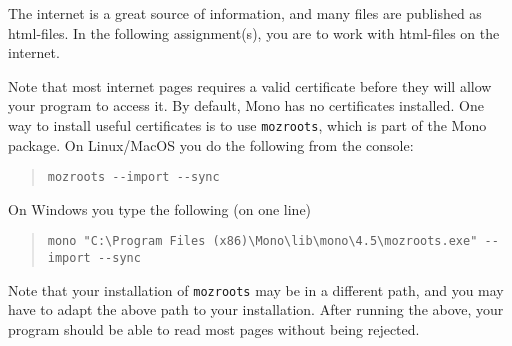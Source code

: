 The internet is a great source of information, and many files are
published as html-files. In the following assignment(s), you are to
work with html-files on the internet.

Note that most internet pages requires a valid certificate before they will allow your program to access it. By default, Mono has no certificates installed. One way to install useful certificates is to use \lstinline[language=console]{mozroots}, which is part of the Mono package. On Linux/MacOS you do the following from the console:
  \begin{quote}
    \lstinline[language=console]{mozroots --import --sync}
  \end{quote}
On Windows you type the following (on one line)
  \begin{quote}
    \lstinline[language=console]{mono "C:\Program Files (x86)\Mono\lib\mono\4.5\mozroots.exe" --import --sync}
  \end{quote}
Note that your installation of \lstinline[language=console]{mozroots} may be in a different path, and you may have to adapt the above path to your installation. After running the above, your program should be able to read most pages without being rejected.
